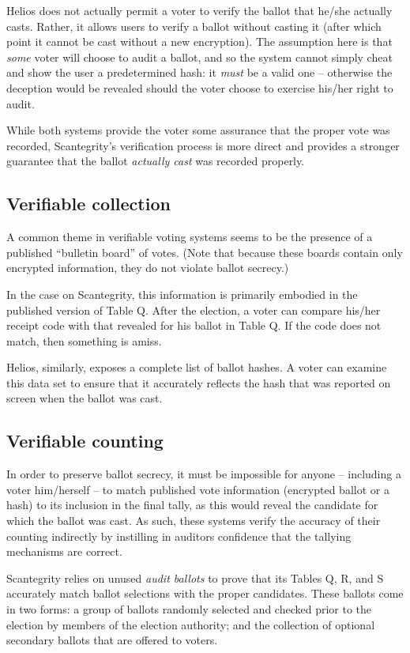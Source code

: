 \documentclass[10pt]{article}
\newcommand{\term}[1]{\textit{#1}}
\begin{document}
\begin{multicols}{2}
Helios does not actually permit a voter to verify the ballot that he/she actually casts. Rather, it
allows users to verify a ballot without casting it (after which point it cannot be cast without
a new encryption). The assumption here is that \emph{some} voter will choose to audit a ballot, and
so the system cannot simply cheat and show the user a predetermined hash: it \emph{must} be a valid
one -- otherwise the deception would be revealed should the voter choose to exercise his/her right
to audit.

While both systems provide the voter some assurance that the proper vote was recorded, Scantegrity's
verification process is more direct and provides a stronger guarantee that the ballot \emph{actually
cast} was recorded properly.

\subsection{Verifiable collection}

A common theme in verifiable voting systems seems to be the presence of a published ``bulletin
board'' of votes. (Note that because these boards contain only encrypted information, they do not
violate ballot secrecy.)

In the case on Scantegrity, this information is primarily embodied in the published version of Table
Q. After the election, a voter can compare his/her receipt code with that revealed for his ballot in
Table Q. If the code does not match, then something is amiss.

Helios, similarly, exposes a complete list of ballot hashes. A voter can examine this data set to
ensure that it accurately reflects the hash that was reported on screen when the ballot was cast.

\subsection{Verifiable counting}

In order to preserve ballot secrecy, it must be impossible for anyone -- including a voter
him/herself -- to match published vote information (encrypted ballot or a hash) to its inclusion in
the final tally, as this would reveal the candidate for which the ballot was cast. As such, these
systems verify the accuracy of their counting indirectly by instilling in auditors confidence that
the tallying mechanisms are correct.

Scantegrity relies on unused \term{audit ballots} to prove that its Tables Q, R, and S accurately
match ballot selections with the proper candidates. These ballots come in two forms: a group of
ballots randomly selected and checked prior to the election by members of the election authority;
and the collection of optional secondary ballots that are offered to voters.


\end{multicols}
\end{document}
